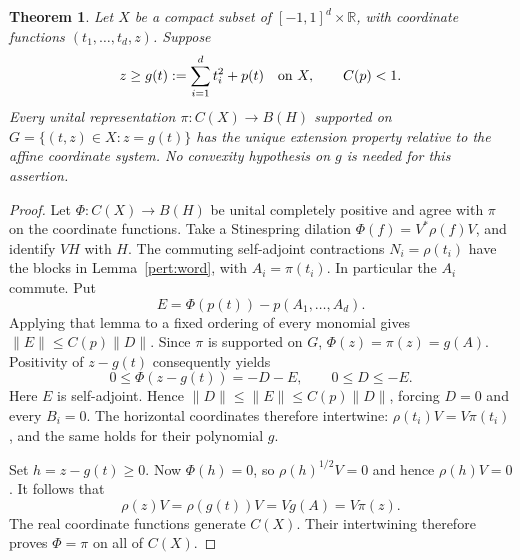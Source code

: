 \documentclass[11pt,letterpaper]{amsart}
\newtheorem{theorem}{Theorem}[section]
\theoremstyle{definition}
\theoremstyle{remark}
\numberwithin{equation}{section}
\newcommand{\R}{\mathbb R}
\begin{document}
\begin{theorem}\label{pert:graph}
Let $X$ be a compact subset of $[-1,1]^d\times\R$, with coordinate
functions $(t_1,\ldots,t_d,z)$. Suppose
\[
       z\geq g(t):=\sum_{i=1}^d t_i^2+p(t)\quad\hbox{on }X,
       \qquad C(p)<1.
\]
Every unital representation $\pi:C(X)\to B(H)$ supported on
$G=\{(t,z)\in X:z=g(t)\}$ has the unique extension property relative
to the affine coordinate system. No convexity hypothesis on $g$ is
needed for this assertion.
\end{theorem}
\begin{proof}
Let $\Phi:C(X)\to B(H)$ be unital completely positive and agree with
$\pi$ on the coordinate functions. Take a Stinespring dilation
$\Phi(f)=V^*\rho(f)V$, and identify $VH$ with $H$.
The commuting self-adjoint contractions $N_i=\rho(t_i)$ have the
blocks in Lemma~\ref{pert:word}, with $A_i=\pi(t_i)$.
In particular the $A_i$ commute. Put
\[
 E=\Phi(p(t))-p(A_1,\ldots,A_d).
\]
Applying that lemma to a fixed ordering of every monomial gives
$\|E\|\leq C(p)\|D\|$. Since $\pi$ is supported on $G$,
$\Phi(z)=\pi(z)=g(A)$. Positivity of $z-g(t)$ consequently yields
\[
       0\leq\Phi(z-g(t))=-D-E,
       \qquad 0\leq D\leq-E.
\]
Here $E$ is self-adjoint. Hence
$\|D\|\leq\|E\|\leq C(p)\|D\|$, forcing $D=0$ and every $B_i=0$.
The horizontal coordinates therefore intertwine:
$\rho(t_i)V=V\pi(t_i)$, and the same holds for their polynomial $g$.

Set $h=z-g(t)\geq0$. Now $\Phi(h)=0$, so
$\rho(h)^{1/2}V=0$ and hence $\rho(h)V=0$. It follows that
\[
          \rho(z)V=\rho(g(t))V=Vg(A)=V\pi(z).
\]
The real coordinate functions generate $C(X)$. Their intertwining
therefore proves $\Phi=\pi$ on all of $C(X)$.
\end{proof}
\end{document}
